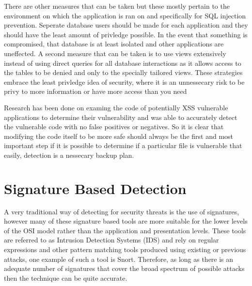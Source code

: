 There are other measures that can be taken but these mostly pertain to the environment on which the application is ran on and specifically for SQL injection prevention.  Seperate database users should be made for each application and they should have the least amount of privledge possible.  In the event that something is compromised, that database is at least isolated and other applications are uneffected.  A second measure that can be taken is to use views extensively instead of using direct queries for all database interactions as it allows access to the tables to be denied and only to the specially tailored views.  These strategies embrace the least privledge idea of security, where it is an unnessecary risk to be privy to more information or have more access than you need %

Research has been done on examing the code of potentially XSS vulnerable applications to determine their vulnerability and was able to accurately detect the vulnerable code with no false positives or negatives.  So it is clear that modifying the code itself to be more safe should always be the first and most important step if it is possible to determine if a particular file is vulnerable that easily, detection is a nessecary backup plan. %

\section{Signature Based Detection}

A very traditional way of detecting for security threats is the use of signatures, however many of these signature based tools are more suitable for the lower levels of the OSI model rather than the application and presentation levels. %
These tools are referred to as Intrusion Detection Systems (IDS) and rely on regular expressions and other pattern matching tools produced using existing or previous attacks, one example of such a tool is Snort. %
Therefore, as long as there is an adequate number of signatures that cover the broad spectrum of possible attacks then the technique can be quite accurate.  

